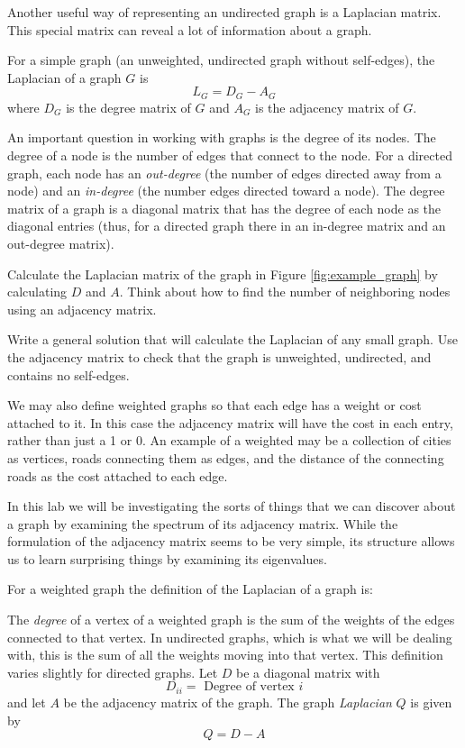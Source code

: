 Another useful way of representing an undirected graph is a Laplacian matrix.
This special matrix can reveal a lot of information about a graph.
\begin{definition}
For a simple graph (an unweighted, undirected graph without self-edges), the Laplacian of a graph $G$ is
\[ L_G = D_G - A_G \]
where $D_G$ is the degree matrix of $G$ and $A_G$ is the adjacency matrix of $G$.
\end{definition}
An important question in working with graphs is the degree of its nodes.
The degree of a node is the number of edges that connect to the node.
For a directed graph, each node has an \emph{out-degree} (the number of edges directed away from a node) and an \emph{in-degree} (the number edges directed toward a node).
The degree matrix of a graph is a diagonal matrix that has the degree of each node as the diagonal entries (thus, for a directed graph there in an in-degree matrix and an out-degree matrix).

\begin{problem}
Calculate the Laplacian matrix of the graph in Figure \ref{fig:example_graph} by calculating $D$ and $A$.
Think about how to find the number of neighboring nodes using an adjacency matrix.

Write a general solution that will calculate the Laplacian of any small graph.
Use the adjacency matrix to check that the graph is unweighted, undirected, and contains no self-edges.
\label{prob:laplacian}
\end{problem}


We may also define weighted graphs so that each edge has a weight or cost attached to it.
In this case the adjacency matrix will have the cost in each entry, rather than just a 1 or 0.
An example of a weighted may be a collection of cities as vertices, roads connecting them as edges, and the distance of the connecting roads as the cost attached to each edge.

In this lab we will be investigating the sorts of things that we can discover about a graph by examining the spectrum of its adjacency matrix.
While the formulation of the adjacency matrix seems to be very simple, its structure allows us to learn surprising things by examining its eigenvalues.

For a weighted graph the definition of the Laplacian of a graph is:

\begin{definition}  The \emph{degree} of a vertex of a weighted graph is the sum of the weights of the edges connected to that vertex.
In undirected graphs, which is what we will be dealing with, this is the sum of all the weights moving into that vertex.
This definition varies slightly for directed graphs.
Let $D$ be a diagonal matrix with
\[
D_{ii} = \mbox{ Degree of vertex $i$}
\]
and let $A$ be the adjacency matrix of the graph.
The graph \emph{Laplacian} $Q$ is given by
\[
Q = D-A
\]
\end{definition}

